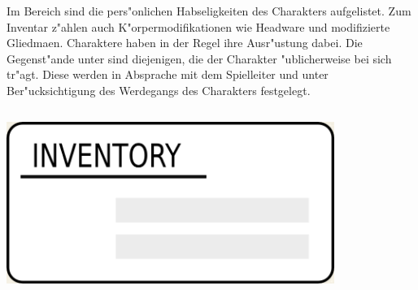 \begin{column}[l]{0.55}
    Im Bereich  sind die pers"onlichen Habseligkeiten des Charakters aufgelistet. Zum Inventar z"ahlen auch K"orpermodifikationen wie Headware und modifizierte Gliedma\3en. Charaktere haben in der Regel ihre Ausr"ustung dabei. Die Gegenst"ande unter  sind diejenigen, die der Charakter "ublicherweise bei sich tr"agt. Diese werden in Absprache mit dem Spielleiter und unter Ber"ucksichtigung des Werdegangs des Charakters festgelegt.
\end{column}
\begin{column}[r]{0.45}
    \centering
    \includegraphics[width=0.80\textwidth]{images/character_inventory.jpg}
\end{column}
